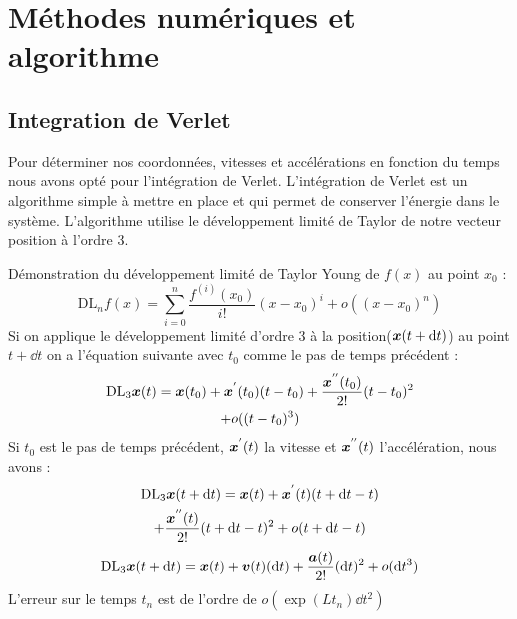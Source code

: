 \section{Méthodes numériques et algorithme}
    \subsection{Integration de Verlet}
        Pour déterminer nos coordonnées, vitesses et accélérations en fonction du temps nous avons opté pour l'intégration de Verlet. L'intégration de Verlet est un algorithme simple à mettre en place et qui permet de conserver l'énergie dans le système. L'algorithme utilise le développement limité de Taylor de notre vecteur position à l'ordre 3.

        Démonstration du développement limité de Taylor Young de $f(x)$ au point $x_0$\cite{agarwal_introduction_2011} :%
        \begin{equation}
            \mathrm{DL}_n f(x) = \sum_{i=0}^{n}\frac{f^{(i)}(x_0)}{i!}(x-x_0)^i+ o((x-x_0)^n)
        \end{equation}
        Si on applique le développement limité d'ordre 3 à la position($\vb*{x}(t+\mathrm{d}t)$) au point $t+\dd t$ on a l'équation suivante avec $t_0$ comme le pas de temps précédent :
        \begin{multline}
            \mathrm{DL}_3 \vb*{x}(t) = \vb*{x}(t_0)+\vb*{x}^{'}(t_0)(t-t_0)+\frac{\vb*{x}^{''}(t_0)}{2!}(t-t_0)^2 \\+o((t-t_0)^3)
        \end{multline}
        Si $t_0$ est le pas de temps précédent, $\vb*{x}^{'}(t)$ la vitesse et $\vb*{x}^{''}(t)$ l'accélération, nous avons :
        \begin{multline}
            \mathrm{DL}_3 \vb*{x}(t+\mathrm{d}t) = \vb*{x}(t)+\vb*{x}^{'}(t)(t+\mathrm{d}t-t)
            \\+\frac{\vb*{x}^{''}(t)}{2!}(t+\mathrm{d}t-t)^2+o(t+\mathrm{d}t-t)
            \label{eq:posx}
        \end{multline}
        \begin{equation}
             \mathrm{DL}_3 \vb*{x}(t+\mathrm{d}t)= \vb*{x}(t)+\vb*{v}(t)(\mathrm{d}t)+\frac{\vb*{a}(t)}{2!}(\mathrm{d}t)^2
             \\+o(\mathrm{d}t^3)
        \end{equation}
        L'erreur sur le temps $t_n$ est de l'ordre de $o(\exp(Lt_n)\dd t^2)$ %

